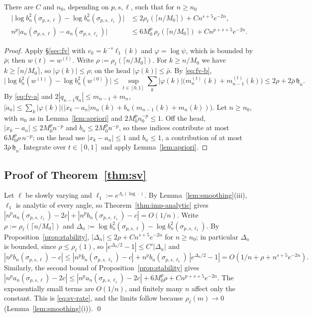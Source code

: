 \begin{proposition}[stability]\label{prop:stability}
There are $C$ and $n_0$, depending on $p,s,\ell$, such that for $n\ge n_0$
\begin{align*}
  \bigl|\log b_n^2(\sigma_{p,s,\ell})-\log b_n^2(\sigma_{p,s,\ell_1})\bigr|
    &\le2\rho_\ell(\lceil n/M_0\rceil)+Cn^{s+5}e^{-2n},\\
  n^p\bigl|a_n(\sigma_{p,s,\ell})-a_n(\sigma_{p,s,\ell_1})\bigr|
    &\le6M_0^p\,\rho_\ell(\lceil n/M_0\rceil)+Cn^{p+s+5}e^{-2n}.
\end{align*}
\end{proposition}

\begin{proof}
Apply \S\ref{sec:fv} with $v_k=k^{-s}\ell_1(k)$ and $\varphi=\log\psi$, which is bounded by $\bar\rho$; then
$w(t)=w^{(t)}$. Write $\rho:=\rho_\ell(\lceil n/M_0\rceil)$. For $k\ge n/M_0$ we have $k\ge\lceil n/M_0\rceil$, so
$|\varphi(k)|\le\rho$; on the head $|\varphi(k)|\le\bar\rho$. By \eqref{eq:fv-b},
\[
  \bigl|\log b_n^2(w^{(1)})-\log b_n^2(w^{(0)})\bigr|\le\sup_{t\in[0,1]}\sum_k|\varphi(k)|\bigl(m^{(t)}_n(k)
  +m^{(t)}_{n-1}(k)\bigr)\le2\rho+2\bar\rho\,\mathfrak h_n .
\]
By \eqref{eq:fv-a} and $2|q_{n-1}q_n|\le m_{n-1}+m_n$,
$|\dot a_n|\le\sum_k|\varphi(k)|\bigl(|x_k-a_n|m_n(k)+b_n(m_{n-1}(k)+m_n(k))\bigr)$. Let $n\ge n_0$, with $n_0$ as in
Lemma~\ref{lem:apriori} and $2M_0^pn_0^{-p}\le1$. Off the head, $|x_k-a_n|\le2M_0^pn^{-p}$ and $b_n\le2M_0^pn^{-p}$, so
these indices contribute at most $6M_0^p\rho\,n^{-p}$; on the head use $|x_k-a_n|\le1$ and $b_n\le1$, a contribution of
at most $3\bar\rho\,\mathfrak h_n$. Integrate over $t\in[0,1]$ and apply Lemma~\ref{lem:apriori}.
\end{proof}

\subsection{Proof of Theorem~\ref{thm:sv}}\label{sec:proof-sv}
Let $\ell$ be slowly varying and $\ell_1:=e^{\Lambda_\ell(\log\cdot)}$. By Lemma~\ref{lem:smoothing}(iii), $\ell_1$ is
analytic of every angle, so Theorem~\ref{thm:imp-analytic} gives
$|n^pa_n(\sigma_{p,s,\ell_1})-2c|+|n^pb_n(\sigma_{p,s,\ell_1})-c|=O(1/n)$. Write $\rho:=\rho_\ell(\lceil n/M_0\rceil)$ and
$\Delta_n:=\log b_n^2(\sigma_{p,s,\ell})-\log b_n^2(\sigma_{p,s,\ell_1})$. By Proposition~\ref{prop:stability},
$|\Delta_n|\le2\rho+Cn^{s+5}e^{-2n}$ for $n\ge n_0$; in particular $\Delta_n$ is bounded, since $\rho\le\rho_\ell(1)$,
so $|e^{\Delta_n/2}-1|\le C'|\Delta_n|$ and
\[
  |n^pb_n(\sigma_{p,s,\ell})-c|\le|n^pb_n(\sigma_{p,s,\ell_1})-c|+n^pb_n(\sigma_{p,s,\ell_1})\,|e^{\Delta_n/2}-1|
  =O(1/n+\rho+n^{s+5}e^{-2n}).
\]
Similarly, the second bound of Proposition~\ref{prop:stability} gives
$|n^pa_n(\sigma_{p,s,\ell})-2c|\le|n^pa_n(\sigma_{p,s,\ell_1})-2c|+6M_0^p\rho+Cn^{p+s+5}e^{-2n}$. The exponentially
small terms are $O(1/n)$, and finitely many $n$ affect only the constant. This is \eqref{eq:sv-rate}, and the limits
follow because $\rho_\ell(m)\to0$ (Lemma~\ref{lem:smoothing}(i)). \qed

